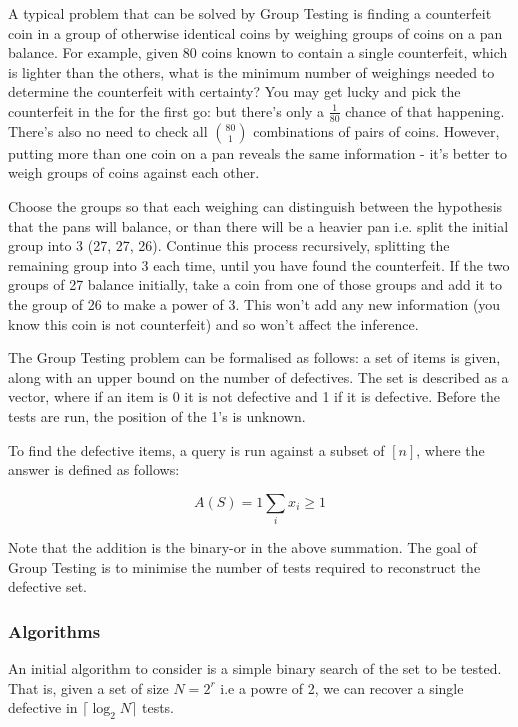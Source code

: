 \documentclass[conference]{IEEEtran}
\begin{document}
A typical problem that can be solved by Group Testing is finding a counterfeit coin in a group of otherwise identical coins by weighing groups of coins on a pan balance. For example, given 80 coins known to contain a single counterfeit, which is lighter than the others, what is the minimum number of weighings needed to determine the counterfeit with certainty? You may get lucky and pick the counterfeit in the for the first go: but there's only a \(\frac{1}{80}\) chance of that happening. There's also no need to check all \(80 \choose 1\) combinations of pairs of coins. However, putting more than one coin on a pan reveals the same information  - it's better to weigh groups of coins against each other.

Choose the groups so that each weighing can distinguish between the hypothesis that the pans will balance, or than there will be a heavier pan i.e. split the initial group into 3 (27, 27, 26). Continue this process recursively, splitting the remaining group into 3 each time, until you have found the counterfeit. If the two groups of 27 balance initially, take a coin from one of those groups and add it to the group of 26 to make a power of 3. This won't add any new information (you know this coin is not counterfeit) and so won't affect the inference.

The Group Testing problem can be formalised as follows: a set of items is given, along with an upper bound on the number of defectives. The set is described as a vector, where if an item is 0 it is not defective and 1 if it is defective. Before the tests are run, the position of the 1's is unknown. 

To find the defective items, a query is run against a subset of \([n]\), where the answer is defined as follows:

\begin{equation}
A\left(S\right) = 1 \sum_{i} x_i \geq 1
\end{equation}

Note that the addition is the binary-or in the above summation. The goal of Group Testing is to minimise the number of tests required to reconstruct the defective set.

\subsubsection*{Algorithms}
An initial algorithm to consider is a simple binary search of the set to be tested. That is, given a set of size \(N = 2^r\) i.e a powre of 2, we can recover a single defective in
\(\lceil{\log_2{N}}\rceil\) tests.
\end{document}

